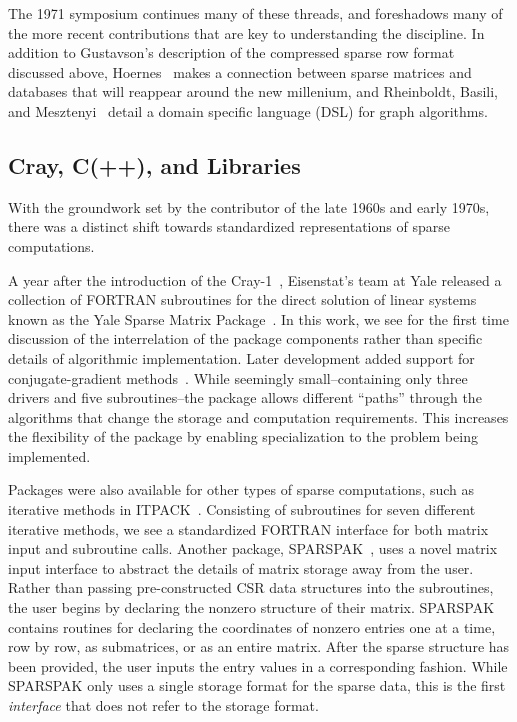 The 1971 symposium continues many of these threads, and foreshadows many of the more recent contributions that are key to understanding the discipline.
In addition to Gustavson's description of the compressed sparse row format discussed above, Hoernes~\cite{hoernes1972generalized} makes a connection between sparse matrices and databases that will reappear around the new millenium, and Rheinboldt, Basili, and Mesztenyi~\cite{rheinboldt1972graal} detail a domain specific language (DSL) for graph algorithms.


\subsection{Cray, C(++), and Libraries}

With the groundwork set by the contributor of the late 1960s and early 1970s, there was a distinct shift towards standardized representations of sparse computations. 

A year after the introduction of the Cray-1~\cite{normand2010first}, Eisenstat's team at Yale released a collection of FORTRAN subroutines for the direct solution of linear systems known as the Yale Sparse Matrix Package~\cite{eisenstat1977yale,eisenstat1977yale2}.
In this work, we see for the first time discussion of the interrelation of the package components rather than specific details of algorithmic implementation.
Later development added support for conjugate-gradient methods~\cite{eisenstat1984new}. 
While seemingly small--containing only three drivers and five subroutines--the package allows different \enquote{paths} through the algorithms that change the storage and computation requirements. 
This increases the flexibility of the package by enabling specialization to the problem being implemented.

Packages were also available for other types of sparse computations, such as iterative methods in ITPACK~\cite{kincaid1982algorithm}.
Consisting of subroutines for seven different iterative methods, we see a standardized FORTRAN interface for both matrix input and subroutine calls. 
Another package, SPARSPAK~\cite{chu1980user,george1984new}, uses a novel matrix input interface to abstract the details of matrix storage away from the user.
Rather than passing pre-constructed CSR data structures into the subroutines, the user begins by declaring the nonzero structure of their matrix. 
SPARSPAK contains routines for declaring the coordinates of nonzero entries one at a time, row by row, as submatrices, or as an entire matrix.
After the sparse structure has been provided, the user inputs the entry values in a corresponding fashion. 
While SPARSPAK only uses a single storage format for the sparse data, this is the first \textit{interface} that does not refer to the storage format.

